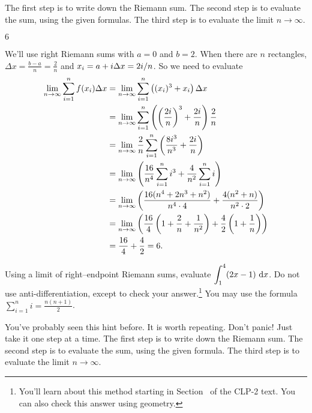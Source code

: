 \begin{hint}
The first step is to write down the Riemann sum.
The second step is to evaluate the sum, using the given formulas.
The third step is to evaluate the limit $n\rightarrow\infty$.
\end{hint}

\begin{answer}
$6$
\end{answer}

\begin{solution}
We'll use right Riemann sums with $a=0$ and $b=2$. When there are $n$ rectangles,
$\Delta x = \frac{b-a}{n}=\frac{2}{n}$ and  $x_i = a+i\Delta x=2i/n$.  So
we need to evaluate
\begin{align*}
\lim_{n\to\infty} \sum_{i=1}^{n} f(x_i)\Delta x
&=\lim_{n\to\infty} \sum_{i=1}^{n} \left( (x_i)^3 + x_i\right) \Delta x\\
  &=\lim_{n\to\infty} \sum_{i=1}^{n} \left( \left(\frac{2i}{n}\right)^3 + \frac{2i}{n}\right)
             \frac{2}{n} \\
   & = \lim_{n\to\infty} \frac{2}{n} \sum_{i=1}^{n} \left(\frac{8i^3}{n^3} + \frac{2i}{n}\right) \\
&= \lim_{n\to\infty} \left( \frac{16}{n^4} \sum_{i=1}^{n} i^3 + \frac{4}{n^2} \sum_{i=1}^{n} i \right) \\
   & = \lim_{n\to\infty} \left( \frac{16(n^4+2n^3+n^2)}{n^4 \cdot 4} + \frac{4(n^2+n)}{n^2 \cdot 2} \right) \\
&= \lim_{n\to\infty} \left( \frac{16}{4}\left(1+\frac{2}{n} + \frac1{n^2} \right) + \frac{4}{2}\left(1+\frac{1}{n}\right)\right) \\
& = \frac{16}{4} + \frac{4}{2} = 6.
\end{align*}
\end{solution}


\begin{Mquestion}[2014D]
Using a limit of right--endpoint Riemann sums, evaluate
$\displaystyle\int_1^4 (2x-1)\,\,\mathrm{d}x$.
Do not use  anti-differentiation, except to check your answer.\footnote{You'll learn about this method starting in Section~ of the CLP-2 text.
You can also check this answer using geometry.}
You may use the formula $\sum\limits_{i=1}^{n} i = \frac{n(n+1)}{2}$.
\end{Mquestion}

\begin{hint}
You've probably seen this hint before. It is worth repeating.
Don't panic! Just take it one step at a time.
The first step is to write down the Riemann sum.
The second step is to evaluate the sum, using the given formula.
The third step is to evaluate the limit $n\rightarrow\infty$.
\end{hint}

